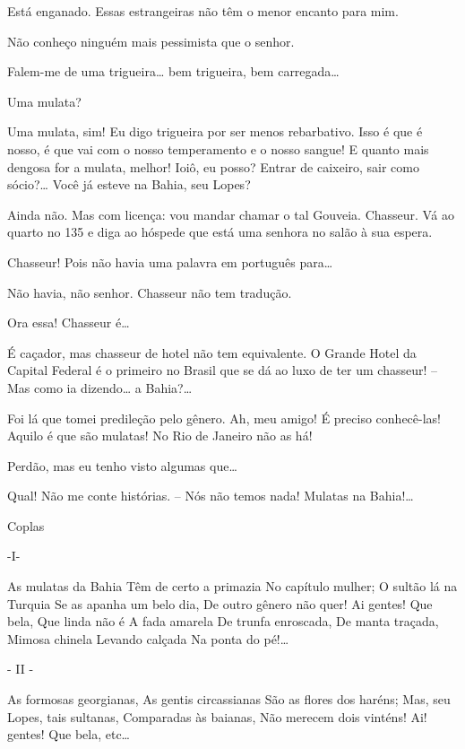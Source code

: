  Está enganado. Essas estrangeiras não têm o menor encanto para
mim.

 Não conheço ninguém mais pessimista que o senhor.

 Falem-me de uma trigueira\ldots{} bem trigueira, bem carregada\ldots{}

 Uma mulata?

 Uma mulata, sim! Eu digo trigueira por ser menos rebarbativo.
Isso é que é nosso, é que vai com o nosso temperamento e o nosso sangue! E quanto
mais dengosa for a mulata, melhor! Ioiô, eu posso? Entrar de caixeiro, sair
como sócio?\ldots{} Você já esteve na Bahia, seu Lopes?

 Ainda não. Mas com licença: vou mandar chamar o tal Gouveia.
 Chasseur.  Vá ao quarto no
135 e diga ao hóspede que está uma senhora no salão à sua espera. 

 Chasseur! Pois não havia uma palavra em português para\ldots{}

 Não havia, não senhor. Chasseur não tem tradução.

 Ora essa! Chasseur é\ldots{}

 É caçador, mas chasseur de hotel não tem equivalente. O Grande
Hotel da Capital Federal é o primeiro no Brasil que se dá ao luxo de ter um
chasseur! -- Mas como ia dizendo\ldots{} a Bahia?\ldots{}

 Foi lá que tomei predileção pelo gênero. Ah, meu amigo! É
preciso conhecê-las! Aquilo é que são mulatas! No Rio de Janeiro não as há!

 Perdão, mas eu tenho visto algumas que\ldots{}

 Qual! Não me conte histórias. -- Nós não temos nada! Mulatas na
Bahia!\ldots{}

 Coplas

 -I-

 As mulatas da Bahia
 Têm de certo a primazia
 No capítulo mulher;
 O sultão lá na Turquia
 Se as apanha um belo dia,
 De outro gênero não quer!
 Ai gentes! Que bela,
 Que linda não é
 A fada amarela
 De trunfa enroscada,
 De manta traçada,
 Mimosa chinela
 Levando calçada
 Na ponta do pé!\ldots{}

 - II -

 As formosas georgianas,
 As gentis circassianas
 São as flores dos haréns;
 Mas, seu Lopes, tais sultanas,
 Comparadas às baianas,
 Não merecem dois vinténs!
 Ai! gentes! Que bela, etc\ldots{}

